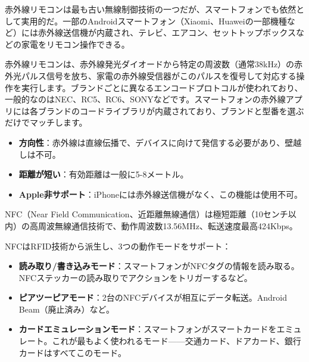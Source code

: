 
赤外線リモコンは最も古い無線制御技術の一つだが、スマートフォンでも依然として実用的だ。一部のAndroidスマートフォン（Xiaomi、Huaweiの一部機種など）には赤外線送信機が内蔵され、テレビ、エアコン、セットトップボックスなどの家電をリモコン操作できる。


赤外線リモコンは、赤外線発光ダイオードから特定の周波数（通常38kHz）の赤外光パルス信号を放ち、家電の赤外線受信器がこのパルスを復号して対応する操作を実行します。ブランドごとに異なるエンコードプロトコルが使われており、一般的なのはNEC、RC5、RC6、SONYなどです。スマートフォンの赤外線アプリには各ブランドのコードライブラリが内蔵されており、ブランドと型番を選ぶだけでマッチします。


\begin{itemize}
  \item \textbf{方向性}：赤外線は直線伝播で、デバイスに向けて発信する必要があり、壁越しは不可。
  \item \textbf{距離が短い}：有効距離は一般に5-8メートル。
  \item \textbf{Apple非サポート}：iPhoneには赤外線送信機がなく、この機能は使用不可。
\end{itemize}


NFC（Near Field Communication、近距離無線通信）は極短距離（10センチ以内）の高周波無線通信技術で、動作周波数13.56MHz、転送速度最高424Kbps。


NFCはRFID技術から派生し、3つの動作モードをサポート：

\begin{itemize}
  \item \textbf{読み取り/書き込みモード}：スマートフォンがNFCタグの情報を読み取る。NFCステッカーの読み取りでアクションをトリガーするなど。
  \item \textbf{ピアツーピアモード}：2台のNFCデバイスが相互にデータ転送。Android Beam（廃止済み）など。
  \item \textbf{カードエミュレーションモード}：スマートフォンがスマートカードをエミュレート。これが最もよく使われるモード——交通カード、ドアカード、銀行カードはすべてこのモード。
\end{itemize}


